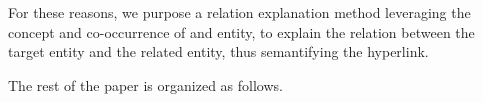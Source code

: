 

For these reasons, we purpose a relation explanation method leveraging the concept and co-occurrence of and entity, to explain the relation between the target entity and the related entity, thus semantifying the hyperlink.

The rest of the paper is organized as follows.

%
